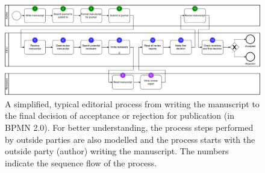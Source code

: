 \documentclass{article}
\begin{document}
\begin{landscape}
    \begin{figure}[htb]
        \centering
        \caption{
            A simplified, typical editorial process from writing the manuscript to the final decision of acceptance or
            rejection for publication (in BPMN 2.0). For better understanding, the process steps performed by outside parties 
            are also modelled and the process starts with the outside party (author) writing the manuscript. The numbers
            indicate the sequence flow of the process.
            \linebreak~
        }
        \label{fig:bpmnEditorialProcess}
        \includegraphics[width=\linewidth]{figures/editorial_process.pdf}
    \end{figure}
\end{landscape}
\end{document}
